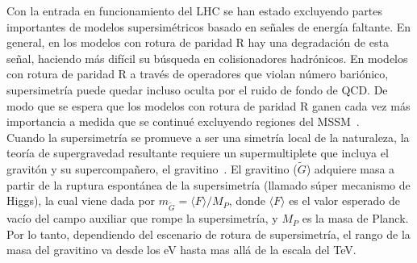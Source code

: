 Con la entrada en funcionamiento del LHC se han estado excluyendo
partes importantes de modelos supersimétricos basado en señales de
energía faltante. En general, en los modelos con rotura de paridad R hay
una degradación de esta señal, haciendo más difícil su búsqueda en
colisionadores hadrónicos. En modelos con rotura de paridad R a través
de operadores que violan número bariónico, supersimetría puede quedar
incluso oculta por el ruido de fondo de QCD. De modo que se espera que los
modelos con rotura de paridad R ganen cada vez más importancia a
medida que se continué excluyendo regiones del MSSM~\cite{Bomark:2011fj}.\\

Cuando la supersimetría se promueve a ser una simetría local de la
naturaleza, la teoría de supergravedad resultante requiere un
supermultiplete que incluya el gravitón y su supercompañero, el
gravitino~\cite{Martin:1997ns,Nilles:1983ge}. El gravitino ($\tilde
G$) adquiere masa a partir de la ruptura espontánea de la
supersimetría (llamado súper mecanismo de Higgs), la cual viene dada
por $m_{\tilde G}=\langle F\rangle/M_P$, donde $\langle F\rangle$ es el valor esperado de vacío
del campo auxiliar que rompe la supersimetría, y $M_P$ es la masa de
Planck. Por lo tanto, dependiendo del escenario de rotura de
supersimetría, el rango de la masa del gravitino va desde los eV hasta
mas allá de la escala del TeV.

